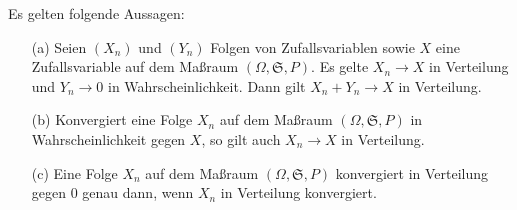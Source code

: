 \begin{lemma}
    Es gelten folgende Aussagen:
    \begin{itemize}
        \item[(a)] Seien $(X_n)$ und $(Y_n)$ Folgen von Zufallsvariablen sowie $X$ eine Zufallsvariable auf dem Maßraum $(\Omega,\mathfrak{S},P)$. Es gelte $X_n\to X$ in Verteilung und $Y_n\to 0$ in Wahrscheinlichkeit. Dann gilt $X_n+Y_n\to X$ in Verteilung.
        \item[(b)] Konvergiert eine Folge $X_n$ auf dem Maßraum $(\Omega,\mathfrak{S},P)$ in Wahrscheinlichkeit gegen $X$, so gilt auch $X_n\to X$ in Verteilung.
        \item[(c)] Eine Folge $X_n$ auf dem Maßraum $(\Omega,\mathfrak{S},P)$ konvergiert in Verteilung gegen $0$ genau dann, wenn $X_n$ in Verteilung konvergiert.  
    \end{itemize}
\end{lemma}